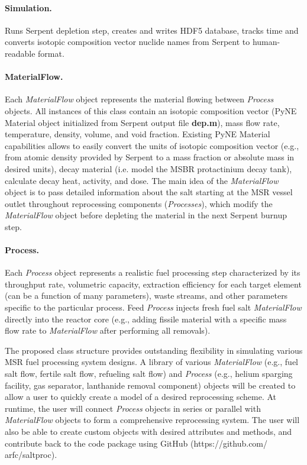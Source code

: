 \documentclass[12pt]{article} %
\begin{document}
	\paragraph{Simulation.} Runs Serpent depletion step, 
	creates and writes HDF5 database, tracks time and converts 
	isotopic composition vector nuclide names from Serpent to human-readable format.
	\paragraph{MaterialFlow.}Each \textit{MaterialFlow} object 
	represents the material flowing between \textit{Process} objects. 
	All instances of this class contain an isotopic composition vector 
	(PyNE Material object initialized from Serpent output file 
	\textbf{dep.m}), mass flow rate, 
	temperature, density, volume, and void fraction. Existing PyNE Material 
	capabilities allows to easily convert the units of isotopic 
	composition vector (e.g., from atomic density provided by Serpent to 
	a mass fraction or absolute mass in desired units), decay material 
	(i.e. model the \gls{MSBR} protactinium decay tank), calculate 
	decay heat, activity, and dose. The main idea of the \textit{MaterialFlow} 
	object is to pass detailed information about the salt starting at the 
	\gls{MSR} vessel outlet throughout reprocessing components 
	(\textit{Processes}), which modify the \textit{MaterialFlow} 
	object before depleting the material in the next Serpent burnup step.
	\paragraph{Process.}Each \textit{Process} object represents a 
	realistic fuel processing step characterized by its throughput rate, 
	volumetric capacity, extraction efficiency for each target element (can be 
	a function of many parameters), waste streams, and other parameters specific 
	to the particular process. Feed	\textit{Process} injects fresh fuel salt 
	\textit{MaterialFlow} directly into the reactor core (e.g., adding fissile 
	material with a specific mass flow rate to \textit{MaterialFlow} after 
	performing all removals).

The proposed class structure provides outstanding flexibility in simulating 
various \gls{MSR} fuel processing system designs. A library of various 
\textit{MaterialFlow} (e.g., 
fuel salt flow, fertile salt flow, refueling salt flow) and \textit{Process} 
(e.g., helium sparging facility, gas separator, lanthanide removal component) 
objects will be created to allow a user to quickly create a model 
of a desired reprocessing scheme. At runtime, the user will connect 
\textit{Process} objects in series or parallel with \textit{MaterialFlow} 
objects to form a comprehensive reprocessing system. The user will also be 
able to create custom objects with desired attributes and methods, and 
contribute back to the code package using GitHub (https://github.com/ arfc/saltproc).	
\end{document}
